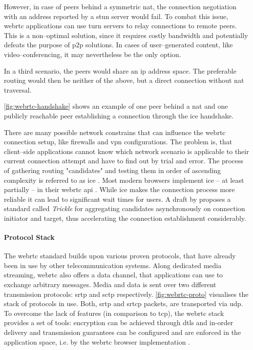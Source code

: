 However, in case of peers behind a symmetric \gls{nat}, the connection negotiation with an address reported by a \gls{stun} server would fail. To combat this issue, \gls{webrtc} applications can use \gls{turn} servers to relay connections to remote peers. This is a non–optimal solution, since it requires costly bandwidth and potentially defeats the purpose of \gls{p2p} solutions. In cases of user–generated content, like video–conferencing, it may nevertheless be the only option.

In a third scenario, the peers would share an \gls{ip} address space. The preferable routing would then be neither of the above, but a direct connection without \gls{nat} traversal.

\vref{fig:webrtc-handshake} shows an example of one peer behind a \gls{nat} and one publicly reachable peer establishing a connection through the \gls{ice} handshake.

There are many possible network constrains that can influence the \gls{webrtc} connection setup, like firewalls and \gls{vpn} configurations. The problem is, that client–side applications cannot know which network scenario is applicable to their current connection attempt and have to find out by trial and error. The process of gathering routing "candidates" and testing them in order of ascending complexity is referred to as \gls{ice} \cite{ice-rfc}. Most modern browsers implement \gls{ice} – at least partially – in their \gls{webrtc} \gls{api} \cite{webrtc-browser-compat}. While \gls{ice} makes the connection process more reliable it can lead to significant wait times for users. A draft by \citet{trickle-ice} proposes a standard called \textit{Trickle} for aggregating candidates asynchronously on connection initiator and target, thus accelerating the connection establishment considerably.

\paragraph{Protocol Stack}\label{par:webrtc-stack}
The \gls{webrtc} standard builds upon various proven protocols, that have already been in use by other telecommunication systems. Along dedicated media streaming, \gls{webrtc} also offers a data channel, that applications can use to exchange arbitrary messages. Media and data is sent over two different transmission protocols: \gls{srtp} and \gls{sctp} respectively. \vref{fig:webrtc-proto} visualises the stack of protocols in use. Both, \gls{srtp} and \gls{srtcp} packets, are transported via \gls{udp}. To overcome the lack of features (in comparison to \gls{tcp}), the \gls{webrtc} stack provides a set of tools: encryption can be achieved through \gls{dtls} and in-order delivery and transmission guarantees can be configured and are enforced in the application space, i.e. by the \gls{webrtc} browser implementation \cite[p. 319]{high-performance-browser-networking}.

